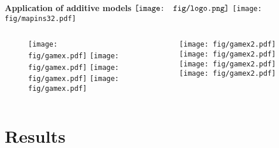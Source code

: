 \documentclass{beamer}
\begin{document}
\begin{frame}{\textbf{Application of additive models} \hspace{0pt plus 1 filll} $\vcenter{\hbox{\texttt{[image: fig/logo.png]}}}$}
\texttt{[image: fig/mapins32.pdf]}
\vfill
\begin{columns}
\begin{column}{0.5\textwidth}
\begin{figure}
\begin{overprint}
\texttt{[image: fig/gamex.pdf]}
\texttt{[image: fig/gamex.pdf]}
\texttt{[image: fig/gamex.pdf]}
\texttt{[image: fig/gamex.pdf]}
\end{overprint}
\end{figure}
\end{column}
\begin{column}{0.5\textwidth}
\begin{figure}
\begin{overprint}
\texttt{[image: fig/gamex2.pdf]}
\texttt{[image: fig/gamex2.pdf]}
\texttt{[image: fig/gamex2.pdf]}
\texttt{[image: fig/gamex2.pdf]}
\end{overprint}
\end{figure}
\end{column}
\end{columns}
\end{frame}

\section{Results}
\end{document}
